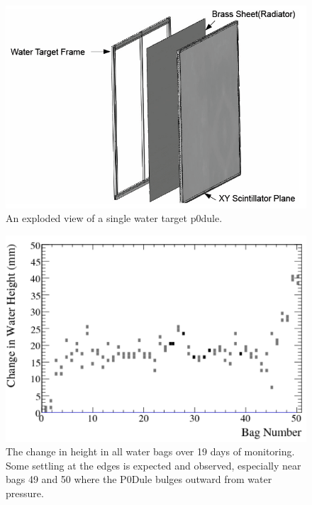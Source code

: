 \begin{figure}
\begin{center}
\includegraphics[width=6in]{./Figures/waterp0dule.png}
\end{center}
\caption{An exploded view of a single water target p0dule.}
\label{fig:waterp0dule}
\end{figure}

\begin{figure}
\begin{center}
\includegraphics[width=.7\textwidth]{./Figures/waterheight.png}
\end{center}
\caption{The change in height in all water bags over 19 days of
  monitoring. Some settling at the edges is expected and observed, especially near bags 49 and 50 where the P0Dule bulges outward from water pressure.}
\label{fig:waterheight}
\end{figure}

